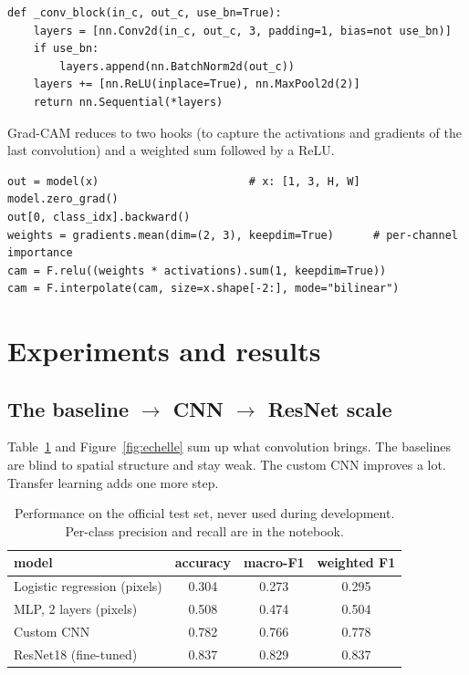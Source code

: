 \documentclass[11pt,a4paper]{article}
\newcommand{\accLogReg}{0.304}
\newcommand{\fLogReg}{0.273}
\newcommand{\fwLogReg}{0.295}
\newcommand{\accMLP}{0.508}
\newcommand{\fMLP}{0.474}
\newcommand{\fwMLP}{0.504}
\newcommand{\accCNN}{0.782}
\newcommand{\fCNN}{0.766}
\newcommand{\fwCNN}{0.778}
\newcommand{\accResnet}{0.837}
\newcommand{\fResnet}{0.829}
\newcommand{\fwResnet}{0.837}
\begin{document}
\begin{lstlisting}
def _conv_block(in_c, out_c, use_bn=True):
    layers = [nn.Conv2d(in_c, out_c, 3, padding=1, bias=not use_bn)]
    if use_bn:
        layers.append(nn.BatchNorm2d(out_c))
    layers += [nn.ReLU(inplace=True), nn.MaxPool2d(2)]
    return nn.Sequential(*layers)
\end{lstlisting}

Grad-CAM reduces to two hooks (to capture the activations and gradients of the last
convolution) and a weighted sum followed by a ReLU.

\begin{lstlisting}
out = model(x)                       # x: [1, 3, H, W]
model.zero_grad()
out[0, class_idx].backward()
weights = gradients.mean(dim=(2, 3), keepdim=True)      # per-channel importance
cam = F.relu((weights * activations).sum(1, keepdim=True))
cam = F.interpolate(cam, size=x.shape[-2:], mode="bilinear")
\end{lstlisting}

\section{Experiments and results}

\subsection{The baseline $\to$ CNN $\to$ ResNet scale}

Table~\ref{tab:scale} and Figure~\ref{fig:echelle} sum up what convolution brings. The
baselines are blind to spatial structure and stay weak. The custom CNN improves a lot.
Transfer learning adds one more step.

\begin{table}[h]
\centering
\small
\begin{tabular}{lccc}
\toprule
model & accuracy & macro-F1 & weighted F1 \\
\midrule
Logistic regression (pixels) & \accLogReg & \fLogReg & \fwLogReg \\
MLP, 2 layers (pixels) & \accMLP & \fMLP & \fwMLP \\
Custom CNN & \accCNN & \fCNN & \fwCNN \\
ResNet18 (fine-tuned) & \accResnet & \fResnet & \fwResnet \\
\bottomrule
\end{tabular}
\caption{Performance on the official test set, never used during development. Per-class
precision and recall are in the notebook.}
\label{tab:scale}
\end{table}
\end{document}
